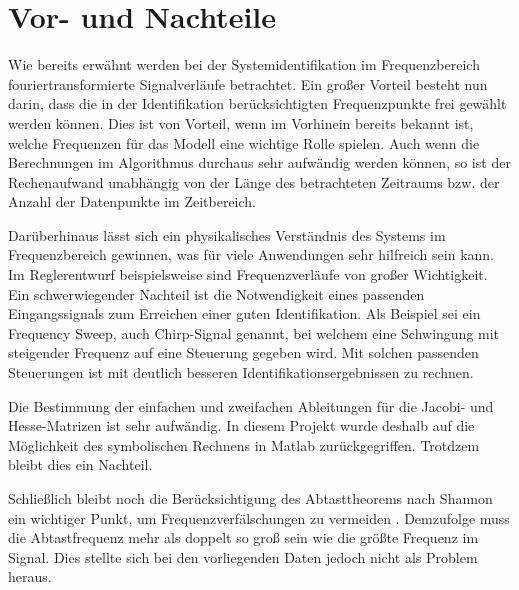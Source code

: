 \section{Vor- und Nachteile}
Wie bereits erwähnt werden bei der Systemidentifikation im Frequenzbereich fouriertransformierte Signalverläufe betrachtet. 
Ein großer Vorteil besteht nun darin, dass die in der Identifikation berücksichtigten Frequenzpunkte frei gewählt werden 
können. Dies ist von Vorteil, wenn im Vorhinein bereits bekannt ist, welche Frequenzen für das Modell eine wichtige Rolle 
spielen. Auch wenn die Berechnungen im Algorithmus durchaus sehr aufwändig werden können, so ist der Rechenaufwand unabhängig 
von der Länge des betrachteten Zeitraums bzw. der Anzahl der Datenpunkte im Zeitbereich.\par
Darüberhinaus lässt sich ein physikalisches Verständnis des Systems im Frequenzbereich gewinnen, was für viele Anwendungen 
sehr hilfreich sein kann. Im Reglerentwurf beispielsweise sind Frequenzverläufe von großer Wichtigkeit.\\

Ein schwerwiegender Nachteil ist die Notwendigkeit eines passenden Eingangssignals zum Erreichen einer guten Identifikation. 
Als Beispiel sei ein Frequency Sweep, auch Chirp-Signal genannt, bei welchem eine Schwingung mit steigender Frequenz auf eine 
Steuerung gegeben wird. Mit solchen passenden Steuerungen ist mit deutlich besseren Identifikationsergebnissen zu rechnen.\par
Die Bestimmung der einfachen und zweifachen Ableitungen für die Jacobi- und Hesse-Matrizen ist sehr aufwändig. In diesem 
Projekt wurde deshalb auf die Möglichkeit des symbolischen Rechnens in Matlab zurückgegriffen. Trotdzem bleibt dies ein 
Nachteil.\par
Schließlich bleibt noch die Berücksichtigung des Abtasttheorems nach Shannon ein wichtiger Punkt, um Frequenzverfälschungen 
zu vermeiden \cite{Grimm2017}. Demzufolge muss die Abtastfrequenz mehr als doppelt so groß sein wie die größte Frequenz im 
Signal. Dies stellte sich bei den vorliegenden Daten jedoch nicht als Problem heraus.



